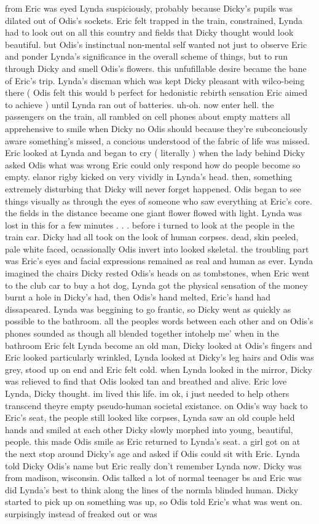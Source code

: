 \documentclass[12pt]{book}
\begin{document}
from Eric was eyed Lynda suspiciously, probably because Dicky's pupils was dilated out of Odis's sockets. Eric felt trapped in the train, constrained, Lynda had to look out on all this country and fields that Dicky thought would look beautiful. but Odis's instinctual non-mental self wanted not just to observe Eric and ponder Lynda's significance in the overall scheme of things, but to run through Dicky and smell Odis's flowers. this unfufillable desire became the bane of Eric's trip. Lynda's discman which was kept Dicky pleasant with wilco-being there (  Odis felt this would b perfect for hedonistic rebirth sensation Eric aimed to achieve ) until Lynda ran out of batteries. uh-oh. now enter hell. the passengers on the train, all rambled on cell phones about empty matters all apprehensive to smile when Dicky no Odis should because they're subconciously aware something's missed, a concious understood of the fabric of life was missed. Eric looked at Lynda and began to cry ( literally ) when the lady behind Dicky asked Odis what was wrong Eric could only respond how do people become so empty. elanor rigby kicked on very vividly in Lynda's head. then, something extremely disturbing that Dicky will never forget happened. Odis began to see things visually as through the eyes of someone who saw everything at Eric's core. the fields in the distance became one giant flower flowed with light. Lynda was lost in this for a few minutes . . .  before i turned to look at the people in the train car. Dicky had all took on the look of human corpses. dead, skin peeled, pale white faced, ocassionally Odis invert into looked skeletal. the troubling part was Eric's eyes and facial expressions remained as real and human as ever. Lynda imagined the chairs Dicky rested Odis's heads on as tombstones, when Eric went to the club car to buy a hot dog, Lynda got the physical sensation of the money burnt a hole in Dicky's had, then Odis's hand melted, Eric's hand had dissapeared. Lynda was beggining to go frantic, so Dicky went as quickly as possible to the bathroom. all the peoples words between each other and on Odis's phones sounded as though all blended together intohelp me' when in the bathroom Eric felt Lynda become an old man, Dicky looked at Odis's fingers and Eric looked particularly wrinkled, Lynda looked at Dicky's leg hairs and Odis was grey, stood up on end and Eric felt cold. when Lynda looked in the mirror, Dicky was relieved to find that Odis looked tan and breathed and alive. Eric love Lynda, Dicky thought. im lived this life. im ok, i just needed to help others transcend theyre empty pseudo-human societal existance. on Odis's way back to Eric's seat, the people still looked like corpses, Lynda saw an old couple held hands and smiled at each other Dicky slowly morphed into young, beautiful, people. this made Odis smile as Eric returned to Lynda's seat. a girl got on at the next stop around Dicky's age and asked if Odis could sit with Eric. Lynda told Dicky Odis's name but Eric really don't remember Lynda now. Dicky was from madison, wisconsin. Odis talked a lot of normal teenager bs and Eric was did Lynda's best to think along the lines of the normla blinded human. Dicky started to pick up on something was up, so Odis told Eric's what was went on. surpisingly instead of freaked out or was 
\end{document}
